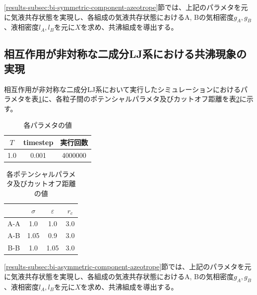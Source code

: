 \documentclass[titlepage]{jsreport}
\begin{document}
\ref{results-subsec:bi-symmetric-component-azeotrope}節では、上記のパラメタを元に気液共存状態を実現し、各組成の気液共存状態におけるA, Bの気相密度$g_A, g_B$、液相密度$l_A, l_B$を元に$X$を求め、共沸組成を導出する。


\subsection{相互作用が非対称な二成分LJ系における共沸現象の実現} \label{method-subsec:bi-asymmetric-component-azeotrope}
相互作用が非対称な二成分LJ系において実行したシミュレーションにおけるパラメタを表\ref{table:asymmetric-bi-component-azeotrope-parameter}に、各粒子間のポテンシャルパラメタ及びカットオフ距離を表\ref{table:asymmetric-bi-component-azeotrope-potential-parameter}に示す。

\begin{table}[htbp]
    \begin{center}
        \caption{各パラメタの値}
        \label{table:asymmetric-bi-component-azeotrope-parameter}
            \begin{tabular}{c c c}
                $T$ & timestep & 実行回数 \\
                \hline
                1.0 & 0.001 & 4000000 \\
            \end{tabular}
    \end{center}
\end{table}

\begin{table}[htbp]
    \begin{center}
        \caption{各ポテンシャルパラメタ及びカットオフ距離の値}
        \label{table:asymmetric-bi-component-azeotrope-potential-parameter}
            \begin{tabular}{c c c c}
                & $\sigma$ & $\varepsilon$ & $r_c$ \\
                \hline
                A-A & 1.0 & 1.0 & 3.0 \\
                A-B & 1.05 & 0.9 & 3.0 \\
                B-B & 1.0 & 1.05 & 3.0
            \end{tabular}
    \end{center}
\end{table}


\ref{results-subsec:bi-asymmetric-component-azeotrope}節では、上記のパラメタを元に気液共存状態を実現し、各組成の気液共存状態におけるA, Bの気相密度$g_A, g_B$、液相密度$l_A, l_B$を元に$X$を求め、共沸組成を導出する。
\end{document}
